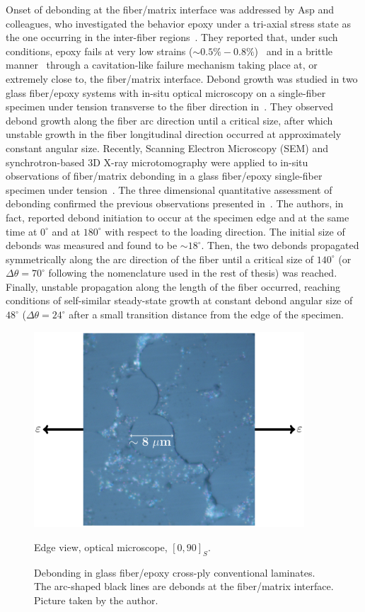 Onset of debonding at the fiber/matrix interface was addressed by Asp and colleagues, who investigated the behavior epoxy under a tri-axial stress state as the one occurring in the inter-fiber regions~\cite{Asp1995}. They reported that, under such conditions, epoxy fails at very low strains ($\sim0.5\%-0.8\%$)~\cite{Asp1995} and in a brittle manner~\cite{Asp1996} through a cavitation-like failure mechanism taking place at, or extremely close to, the fiber/matrix interface. Debond growth was studied in two glass fiber/epoxy systems with in-situ optical microscopy on a single-fiber specimen under tension transverse to the fiber direction in~\cite{Zhang1997}. They observed debond growth along the fiber arc direction until a critical size, after which unstable growth in the fiber longitudinal direction occurred at approximately constant angular size. Recently, Scanning Electron Microscopy (SEM) and synchrotron-based 3D X-ray microtomography were applied to in-situ observations of fiber/matrix debonding in a glass fiber/epoxy single-fiber specimen under tension~\cite{Intro:Martyniuk2013}. The three dimensional quantitative assessment of debonding confirmed the previous observations presented in~\cite{Zhang1997}. The authors, in fact, reported debond initiation to occur at the specimen edge and at the same time at $0^{\circ}$ and at $180^{\circ}$ with respect to the loading direction. The initial size of debonds was measured and found to be $\sim18^{\circ}$. Then, the two debonds propagated symmetrically along the arc direction of the fiber until a critical size of $140^{\circ}$ (or $\Delta\theta=70^{\circ}$ following the nomenclature used in the rest of thesis) was reached. Finally, unstable propagation along the length of the fiber occurred, reaching conditions of self-similar steady-state growth at constant debond angular size of $48^{\circ}$ ($\Delta\theta=24^{\circ}$ after a small transition distance from the edge of the specimen.

\begin{figure}[!h]
\centering
        \includegraphics[width=0.9\textwidth]{pics/transversecracks-micro.pdf}
       \caption{Edge view, optical microscope, $\left[0,90\right]_{S}$.}
\caption{Debonding in glass fiber/epoxy cross-ply conventional laminates. The arc-shaped black lines are debonds at the fiber/matrix interface. Picture taken by the author.}\label{intro:fig:debonding}
\end{figure}

